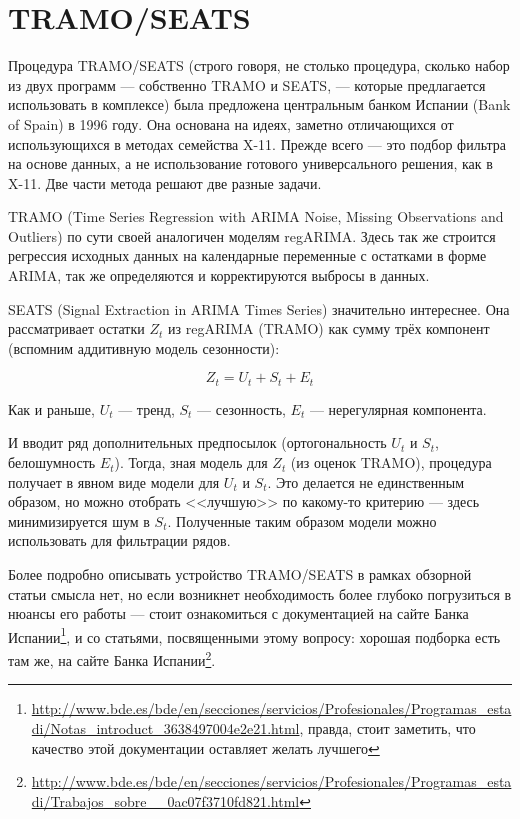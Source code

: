 \documentclass[final,pdftex]{../../template/epsilonj}\usepackage[]{graphicx}\usepackage[]{color}
\begin{document}
\section{TRAMO/SEATS} 

Процедура TRAMO/SEATS (строго говоря, не столько процедура, сколько набор из двух программ --- собственно TRAMO и SEATS, --- которые предлагается использовать в комплексе) была предложена центральным банком Испании (Bank of Spain) в 1996 году. Она основана на идеях, заметно отличающихся от использующихся в методах семейства X-11. Прежде всего --- это подбор фильтра на основе данных, а не использование готового универсального решения, как в X-11. Две части метода решают две разные задачи. 

TRAMO (Time Series Regression with ARIMA Noise, Missing Observations and Outliers) по сути своей аналогичен моделям regARIMA. Здесь так же строится регрессия исходных данных на календарные переменные с остатками в форме ARIMA, так же определяются и корректируются выбросы в данных. 

SEATS (Signal Extraction in ARIMA Times Series) значительно интереснее. Она рассматривает остатки $Z_t$ из regARIMA (TRAMO) как сумму трёх компонент (вспомним аддитивную модель сезонности):

\[
Z_t = U_t + S_t + E_t
\]

Как и раньше, $U_t$ --- тренд, $S_t$ --- сезонность, $E_t$ --- нерегулярная компонента.

И вводит ряд дополнительных предпосылок (ортогональность $U_t$ и $S_t$, белошумность $E_t$). Тогда, зная модель для $Z_t$ (из оценок TRAMO), процедура получает в явном виде модели для $U_t$ и $S_t$. Это делается не единственным образом, но можно отобрать <<лучшую>> по какому-то критерию --- здесь минимизируется шум в $S_t$. Полученные таким образом модели можно использовать для фильтрации рядов. 

Более подробно описывать устройство TRAMO/SEATS в рамках обзорной статьи смысла нет, но если возникнет необходимость более глубоко погрузиться в нюансы его работы --- стоит ознакомиться с документацией на сайте Банка Испании\footnote{\url{http://www.bde.es/bde/en/secciones/servicios/Profesionales/Programas_estadi/Notas_introduct_3638497004e2e21.html}, правда, стоит заметить, что качество этой документации оставляет желать лучшего}, и со статьями, посвященными этому вопросу: хорошая подборка есть там же, на сайте Банка Испании\footnote{\url{http://www.bde.es/bde/en/secciones/servicios/Profesionales/Programas_estadi/Trabajos_sobre__0ac07f3710fd821.html}}. 
\end{document}
